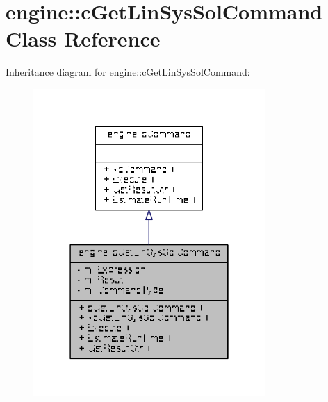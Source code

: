 \hypertarget{classengine_1_1cGetLinSysSolCommand}{\section{engine\-:\-:c\-Get\-Lin\-Sys\-Sol\-Command Class Reference}
\label{classengine_1_1cGetLinSysSolCommand}
}


Inheritance diagram for engine\-:\-:c\-Get\-Lin\-Sys\-Sol\-Command\-:
\nopagebreak
\begin{figure}[H]
\begin{center}
\leavevmode
\includegraphics[width=250pt]{classengine_1_1cGetLinSysSolCommand__inherit__graph}
\end{center}
\end{figure}


